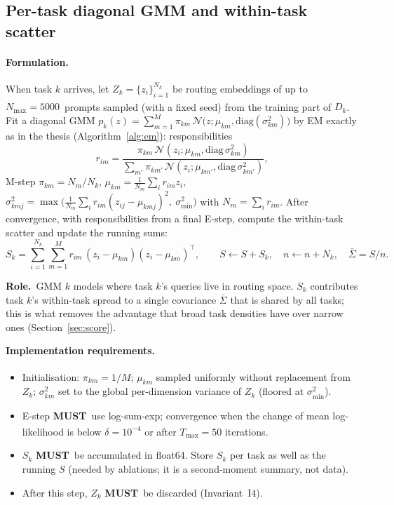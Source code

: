 \documentclass[11pt]{article}
\newcommand{\T}{^{\top}}
\newcommand{\tagthesis}{\textsuperscript{\textcolor{teal!70!black}{\sffamily[thesis]}}}
\newcommand{\MUST}{\textbf{MUST}}
\newcommand{\role}{\par\noindent\textbf{Role.}\ }
\newcommand{\impl}{\par\noindent\textbf{Implementation requirements.}\ }
\begin{document}
\subsection{Per-task diagonal GMM and within-task scatter}\label{sec:gmm}

\paragraph{Formulation.} When task $k$ arrives, let $Z_k=\{z_i\}_{i=1}^{N_k}$ be routing embeddings of up to
$N_{\max}=5000$\tagthesis\ prompts sampled (with a fixed seed) from the training part of $D_k$. Fit a diagonal
GMM $p_k(z)=\sum_{m=1}^{M}\pi_{km}\,\mathcal N\!\big(z;\mu_{km},\mathrm{diag}(\sigma^2_{km})\big)$ by EM exactly as in
the thesis (Algorithm~\ref{alg:em}): responsibilities
\begin{equation}
  r_{im}=\frac{\pi_{km}\,\mathcal N(z_i;\mu_{km},\mathrm{diag}\,\sigma^2_{km})}{\sum_{m'}\pi_{km'}\,\mathcal N(z_i;\mu_{km'},\mathrm{diag}\,\sigma^2_{km'})},
\end{equation}
M-step $\pi_{km}=N_m/N_k$, $\mu_{km}=\frac{1}{N_m}\sum_i r_{im}z_i$,
$\sigma^2_{kmj}=\max\!\big(\frac1{N_m}\sum_i r_{im}(z_{ij}-\mu_{kmj})^2,\ \sigma^2_{\min}\big)$ with $N_m=\sum_i r_{im}$.
After convergence, with responsibilities from a final E-step, compute the within-task scatter and update the
running sums:
\begin{equation}
  S_k=\sum_{i=1}^{N_k}\sum_{m=1}^{M} r_{im}\,(z_i-\mu_{km})(z_i-\mu_{km})\T,\qquad
  S\leftarrow S+S_k,\quad n\leftarrow n+N_k,\quad \bar\Sigma=S/n .
\end{equation}

\role GMM $k$ models where task $k$'s queries live in routing space. $S_k$ contributes task $k$'s within-task
spread to a single covariance $\bar\Sigma$ that is shared by all tasks; this is what removes the advantage that
broad task densities have over narrow ones (Section~\ref{sec:score}).

\impl
\begin{itemize}[leftmargin=*]
  \item Initialisation\tagthesis: $\pi_{km}=1/M$; $\mu_{km}$ sampled uniformly without replacement from $Z_k$;
        $\sigma^2_{km}$ set to the global per-dimension variance of $Z_k$ (floored at $\sigma^2_{\min}$).
  \item E-step \MUST\ use log-sum-exp; convergence when the change of mean log-likelihood is below
        $\delta=10^{-4}$ or after $T_{\max}=50$ iterations\tagthesis.
  \item $S_k$ \MUST\ be accumulated in float64. Store $S_k$ per task as well as the running $S$ (needed by
        ablations; it is a second-moment summary, not data).
  \item After this step, $Z_k$ \MUST\ be discarded (Invariant~I4).
\end{itemize}
\end{document}
